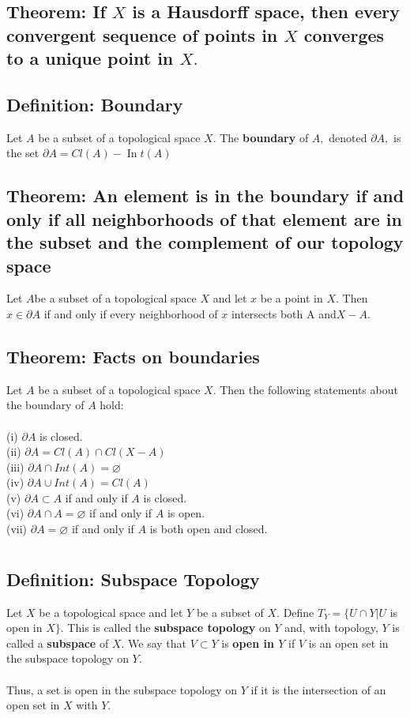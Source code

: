 \documentclass[12pt]{article}
\begin{document}
	\subsection{Theorem: If $X$ is a Hausdorff space, then every convergent sequence of points in $X$ converges to a unique point in $X .$}
	\subsection{Definition: Boundary}
		Let $A$ be a subset of a topological space $X .$ The \textbf{boundary} of $A ,$ denoted $\partial A ,$ is the set $\partial A = C l ( A ) - \operatorname { In } t ( A )$
	\subsection{Theorem: An element is in the boundary if and only if all neighborhoods of that element are in the subset and the complement of our topology space}
		Let $ A  $be a subset of a topological space $X$ and let $x$ be a point in $X .$ Then $x \in \partial A$ if and only if every neighborhood of $x$ intersects both
		A and$X - A .$
	\subsection{Theorem: Facts on boundaries}
		Let $A$ be a subset of a topological space $X .$ Then the following statements about the boundary of $ A $ hold:\\
		\\
		(i) $\partial A$ is closed.\\
		(ii) $\partial A = C l ( A ) \cap C l ( X - A )$\\
		(iii) $\partial A \cap Int ( A ) = \varnothing$\\
		(iv) $\partial A \cup Int ( A ) = C l ( A )$\\
		(v) $\partial A \subset A$ if and only if $A$ is closed.\\
		(vi) $\partial A \cap A = \varnothing$ if and only if $A$ is open.\\
		(vii) $\partial A = \varnothing$ if and only if $A$ is both open and closed.
		
\section{}

\subsection{Definition: Subspace Topology}
	Let $X$ be a topological space and let $Y$ be a subset of $X .$ Define $T _ { Y } = \{ U \cap Y | U$ is open in $X \} .$ This is called the \textbf{subspace topology} on $Y$ and, with topology, $Y$ is called a \textbf{subspace} of $X .$ We say that $V \subset Y$ is \textbf{open in $Y$} if $V$ is an open set in the subspace topology on $Y .$\\
	\\
	Thus, a set is open in the subspace topology on $Y$ if it is the intersection
	of an open set in $X$ with $Y .$
\end{document}
